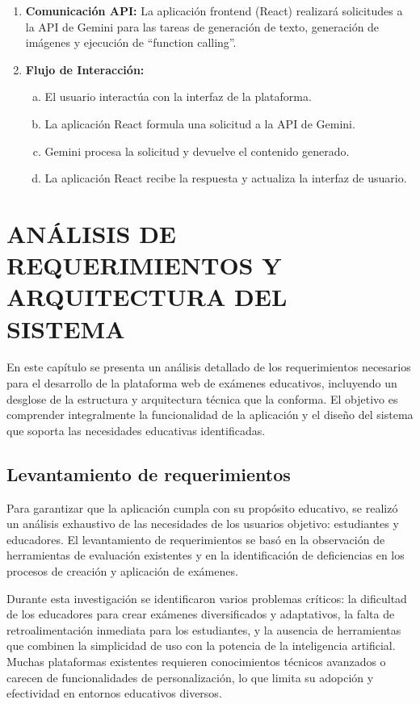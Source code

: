 \documentclass[12pt,a4paper]{report}
\begin{document}
\begin{enumerate}
\item \textbf{Comunicación API:} La aplicación frontend (React) realizará solicitudes a la API de Gemini para las tareas de generación de texto, generación de imágenes y ejecución de ``function calling''.

\item \textbf{Flujo de Interacción:}
\begin{enumerate}[a.]
\item El usuario interactúa con la interfaz de la plataforma.
\item La aplicación React formula una solicitud a la API de Gemini.
\item Gemini procesa la solicitud y devuelve el contenido generado.
\item La aplicación React recibe la respuesta y actualiza la interfaz de usuario.
\end{enumerate}
\end{enumerate}

\chapter{ANÁLISIS DE REQUERIMIENTOS Y ARQUITECTURA DEL SISTEMA}

En este capítulo se presenta un análisis detallado de los requerimientos necesarios para el desarrollo de la plataforma web de exámenes educativos, incluyendo un desglose de la estructura y arquitectura técnica que la conforma. El objetivo es comprender integralmente la funcionalidad de la aplicación y el diseño del sistema que soporta las necesidades educativas identificadas.

\section{Levantamiento de requerimientos}

Para garantizar que la aplicación cumpla con su propósito educativo, se realizó un análisis exhaustivo de las necesidades de los usuarios objetivo: estudiantes y educadores. El levantamiento de requerimientos se basó en la observación de herramientas de evaluación existentes y en la identificación de deficiencias en los procesos de creación y aplicación de exámenes.

Durante esta investigación se identificaron varios problemas críticos: la dificultad de los educadores para crear exámenes diversificados y adaptativos, la falta de retroalimentación inmediata para los estudiantes, y la ausencia de herramientas que combinen la simplicidad de uso con la potencia de la inteligencia artificial. Muchas plataformas existentes requieren conocimientos técnicos avanzados o carecen de funcionalidades de personalización, lo que limita su adopción y efectividad en entornos educativos diversos.
\end{document}
